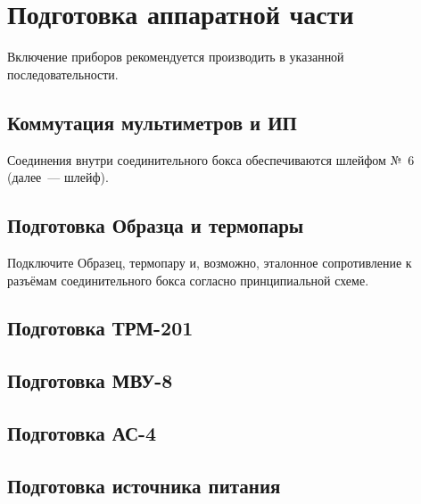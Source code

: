\documentclass[12pt, a4paper, twocolumn]{report}
\begin{document}
\section{Подготовка аппаратной части}

Включение приборов рекомендуется производить в указанной последовательности.

\subsection{Коммутация мультиметров и ИП}

Соединения внутри соединительного бокса обеспечиваются шлейфом №~6 (далее~--- шлейф).



\subsection{Подготовка Образца и термопары}

Подключите Образец, термопару и, возможно, эталонное сопротивление к разъёмам соединительного бокса согласно принципиальной схеме.

\subsection{Подготовка ТРМ-201}



\subsection{Подготовка МВУ-8}



\subsection{Подготовка АС-4}



\subsection{Подготовка источника питания}



\end{document}
